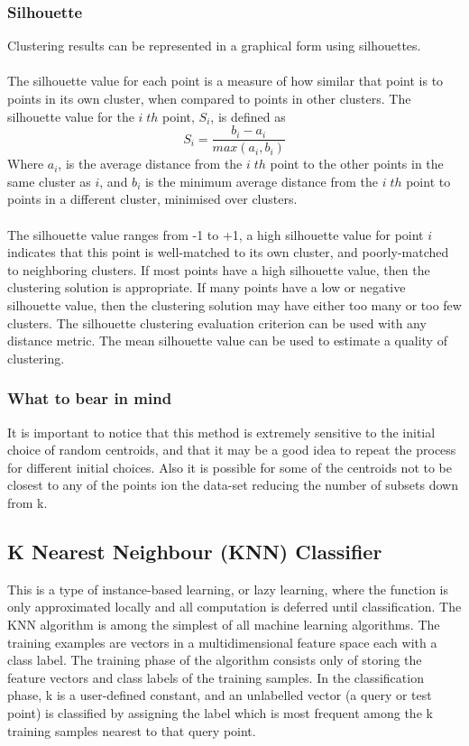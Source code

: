 \subsubsection{Silhouette}
Clustering results can be represented in a graphical form using silhouettes.
\\\\
The silhouette value for each point is a measure of how similar that point is to points in its own cluster, when compared to points in other clusters. The silhouette value for the  $i\;th$ point, $S_i$, is defined as
\begin{equation}
    S_i = \frac{b_i - a_i}{max(a_i,b_i)}
\end{equation}
Where $a_i$, is the average distance from the $i\;th$ point to the other points in the same cluster as $i$, and $b_i$ is the minimum average distance from the $i\;th$ point to points in a different cluster, minimised over clusters.
\\\\
The silhouette value ranges from -1 to +1, a high silhouette value for point $i$ indicates that this point is well-matched to its own cluster, and poorly-matched to neighboring clusters. If most points have a high silhouette value, then the clustering solution is appropriate. If many points have a low or negative silhouette value, then the clustering solution may have either too many or too few clusters. The silhouette clustering evaluation criterion can be used with any distance metric. The mean silhouette value can be used to estimate a quality of clustering.
\subsubsection{What to bear in mind}
It is important to notice that this method is extremely sensitive to the initial choice of random centroids, and that it may be a good idea to repeat the process for different initial choices. Also it is possible for some of the centroids not to be closest to any of the points ion the data-set reducing the number of subsets down from k.
\subsection{K Nearest Neighbour (KNN) Classifier}
This is a type of instance-based learning, or lazy learning, where the function is only approximated locally and all computation is deferred until classification. The KNN algorithm is among the simplest of all machine learning algorithms. The training examples are vectors in a multidimensional feature space each with a class label. The training phase of the algorithm consists only of storing the feature vectors and class labels of the training samples.  In the classification phase, k is a user-defined constant, and an unlabelled vector (a query or test point) is classified by assigning the label which is most frequent among the k training samples nearest to that query point.
